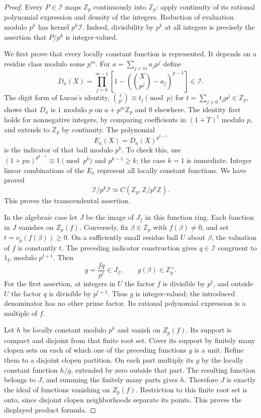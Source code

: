 \documentclass[11pt,a4paper]{article}
\newcommand{\Z}{\mathbb Z}
\theoremstyle{definition}
\theoremstyle{remark}
\theoremstyle{plain}
\numberwithin{equation}{section}
\begin{document}
\begin{proof}
Every $P\in\mathcal I$ maps $\Z_p$ continuously into $\Z_p$:
apply continuity of its rational polynomial expression and density
of the integers.  Reduction of evaluation modulo $p^k$ has kernel
$p^k\mathcal I$.  Indeed, divisibility by $p^k$ at all integers
is precisely the assertion that $P/p^k$ is integer-valued.

We first prove that every locally constant function is represented.
It depends on a residue class modulo some $p^m$.  For
$a=\sum_{j<m}a_jp^j$ define
\[
 D_a(X)=\prod_{j=0}^{m-1}
 \left[1-\left(\binom X{p^j}-a_j\right)^{p-1}\right]\in\mathcal I.
\]
The digit form of Lucas's identity,
$\binom{t}{p^j}\equiv t_j\pmod p$ for
$t=\sum_{j\ge0}t_jp^j\in\Z_p$, shows that $D_a$ is $1$
modulo $p$ on $a+p^m\Z_p$ and $0$ elsewhere.  The identity first
holds for nonnegative integers, by comparing coefficients in
$(1+T)^t$ modulo $p$, and extends to $\Z_p$ by continuity.
The polynomial
\[
 E_a(X)=D_a(X)^{p^{k-1}}
\]
is the indicator of that ball modulo $p^k$.  To check this, use
$(1+pu)^{p^{k-1}}\equiv1\pmod{p^k}$ and
$p^{k-1}\ge k$; the case $k=1$ is immediate.
Integer linear combinations of the $E_a$ represent all locally
constant functions.  We have proved
\[
 \mathcal I/p^k\mathcal I\simeq C(\Z_p,\Z/p^k\Z).
\]
This proves the transcendental assertion.

In the algebraic case let $J$ be the image of $J_f$ in this function
ring.  Each function in $J$ vanishes on $Z_p(f)$.  Conversely,
fix $\beta\in\Z_p$ with $f(\beta)\ne0$, and set
$t=v_p(f(\beta))\ge0$.  On a sufficiently small residue ball
$U$ about $\beta$, the valuation of $f$ is constantly $t$.
The preceding indicator construction gives $q\in\mathcal I$
congruent to $1_U$ modulo $p^{t+1}$.  Then
\[
 g=\frac{fq}{p^t}\in J_f,\qquad g(\beta)\in\Z_p^\times.
\]
For the first assertion, at integers in $U$ the factor $f$ is
divisible by $p^t$, and outside $U$ the factor $q$ is divisible
by $p^{t+1}$.  Thus $g$ is integer-valued; the introduced denominator
has no other prime factor.  Its rational polynomial expression
is a multiple of $f$.

Let $h$ be locally constant modulo $p^k$ and vanish on $Z_p(f)$.
Its support is compact and disjoint from that finite root set.
Cover its support by finitely many clopen sets on each of which
one of the preceding functions $g$ is a unit.  Refine them to a
disjoint clopen partition.  On each part multiply its $g$ by
the locally constant function $h/g$, extended by zero outside
that part.  The resulting function belongs to $J$, and summing
the finitely many parts gives $h$.  Therefore $J$ is exactly
the ideal of functions vanishing on $Z_p(f)$.
Restriction to this finite root set is onto, since disjoint
clopen neighborhoods separate its points.  This proves the
displayed product formula.


\end{proof}
\end{document}
